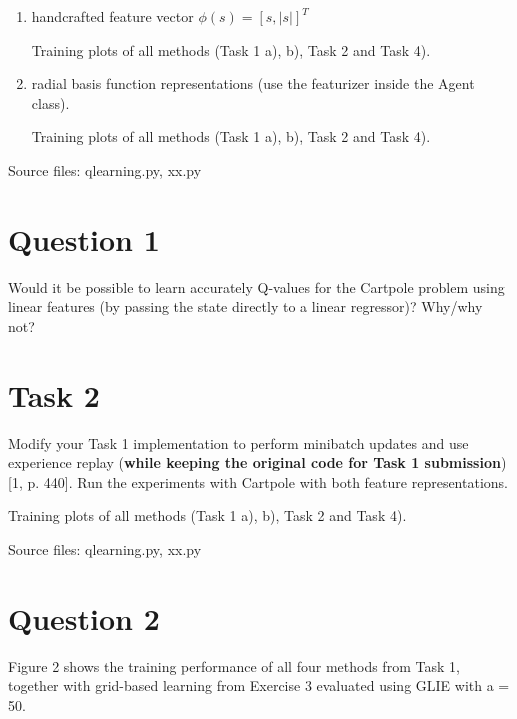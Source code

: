\documentclass[12pt]{article}
\begin{document}
\pagebreak


\begin{enumerate}[label=(\alph*)]
    \item handcrafted feature vector $\phi(s) = [s,|s|]^T$

Training plots of all methods (Task 1 a), b), Task 2 and Task 4).    
    
    \item radial basis function representations (use the featurizer inside the Agent class).

Training plots of all methods (Task 1 a), b), Task 2 and Task 4).
    
\end{enumerate}


\noindent
Source files: qlearning.py, xx.py 

\section*{Question 1}

Would it be possible to learn accurately Q-values for the Cartpole
problem using linear features (by passing the state directly to a linear regressor)? Why/why
not?

\section*{Task 2}

Modify your Task 1 implementation to perform minibatch updates and
use experience replay (\textbf{while keeping the original code for Task 1 submission}) [1, p. 440].
Run the experiments with Cartpole with both feature representations.
\newline

Training plots of all methods (Task 1 a), b), Task 2 and Task 4).
\newline

\noindent
Source files: qlearning.py, xx.py 

\section*{Question 2}

Figure 2 shows the training performance of all four methods from Task 1, together
with grid-based learning from Exercise 3 evaluated using GLIE with a = 50.
\end{document}
